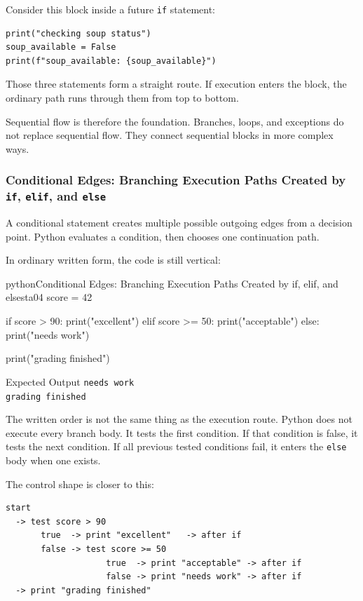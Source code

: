 \documentclass[a4paper,twoside]{report}
\begin{document}
Consider this block inside a future \texttt{if} statement:

\begin{verbatim}
print("checking soup status")
soup_available = False
print(f"soup_available: {soup_available}")
\end{verbatim}

Those three statements form a straight route. If execution enters the block, the ordinary path runs through them from top to bottom.

Sequential flow is therefore the foundation. Branches, loops, and exceptions do not replace sequential flow. They connect sequential blocks in more complex ways.

\subsubsection{Conditional Edges: Branching Execution Paths Created by \texttt{if}, \texttt{elif}, and \texttt{else}}

A conditional statement creates multiple possible outgoing edges from a decision point. Python evaluates a condition, then chooses one continuation path.

In ordinary written form, the code is still vertical:

\begin{codebox}[]{python}{Conditional Edges: Branching Execution Paths Created by if, elif, and else}{sta04}
score = 42

if score > 90:
    print("excellent")
elif score >= 50:
    print("acceptable")
else:
    print("needs work")

print("grading finished")
\end{codebox}


\begin{iobox}{Expected Output}
\texttt{needs work} \\
\texttt{grading finished} \\
\end{iobox}


The written order is not the same thing as the execution route. Python does not execute every branch body. It tests the first condition. If that condition is false, it tests the next condition. If all previous tested conditions fail, it enters the \texttt{else} body when one exists.

The control shape is closer to this:

\begin{verbatim}
start
  -> test score > 90
       true  -> print "excellent"   -> after if
       false -> test score >= 50
                    true  -> print "acceptable" -> after if
                    false -> print "needs work" -> after if
  -> print "grading finished"
\end{verbatim}
\end{document}

